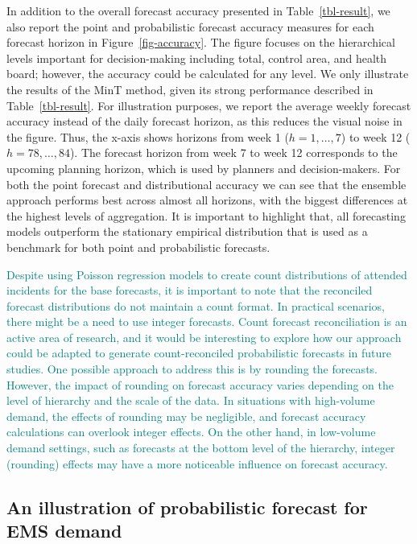 \documentclass[
  authoryear,
  preprint,
  3p]{elsarticle}
\begin{document}
In addition to the overall forecast accuracy presented in
Table~\ref{tbl-result}, we also report the point and probabilistic
forecast accuracy measures for each forecast horizon in
Figure~\ref{fig-accuracy}. The figure focuses on the hierarchical levels
important for decision-making including total, control area, and health
board; however, the accuracy could be calculated for any level. We only
illustrate the results of the MinT method, given its strong performance
described in Table~\ref{tbl-result}. For illustration purposes, we
report the average weekly forecast accuracy instead of the daily
forecast horizon, as this reduces the visual noise in the figure. Thus,
the x-axis shows horizons from week 1 (\(h= 1,\dots,7\)) to week 12
(\(h= 78,\dots,84\)). The forecast horizon from week 7 to week 12
corresponds to the upcoming planning horizon, which is used by planners
and decision-makers. For both the point forecast and distributional
accuracy we can see that the ensemble approach performs best across
almost all horizons, with the biggest differences at the highest levels
of aggregation. It is important to highlight that, all forecasting
models outperform the stationary empirical distribution that is used as
a benchmark for both point and probabilistic forecasts.

\textcolor{teal}{Despite using Poisson regression models to create count distributions of attended incidents for the base forecasts, it is important to note that the reconciled forecast distributions do not maintain a count format. In practical scenarios, there might be a need to use integer forecasts. Count forecast reconciliation is an active area of research, and it would be interesting to explore how our approach could be adapted to generate count-reconciled probabilistic forecasts in future studies. One possible approach to address this is by rounding the forecasts. However, the impact of rounding on forecast accuracy varies depending on the level of hierarchy and the scale of the data. In situations with high-volume demand, the effects of rounding may be negligible, and forecast accuracy calculations can overlook integer effects. On the other hand, in low-volume demand settings, such as forecasts at the bottom level of the hierarchy, integer (rounding) effects may have a more noticeable influence on forecast accuracy.}

\hypertarget{an-illustration-of-probabilistic-forecast-for-ems-demand}{%
\subsection{An illustration of probabilistic forecast for EMS
demand}\label{an-illustration-of-probabilistic-forecast-for-ems-demand}}
\end{document}
